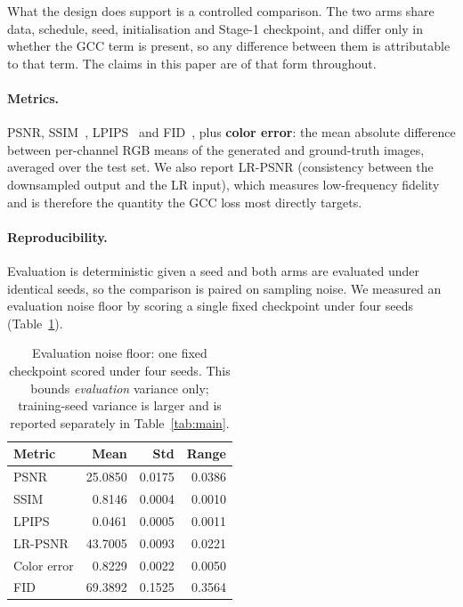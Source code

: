\documentclass[11pt]{article}
\begin{document}
What the design does support is a controlled comparison. The two arms share
data, schedule, seed, initialisation and Stage-1 checkpoint, and differ only in
whether the GCC term is present, so any difference between them is attributable
to that term. The claims in this paper are of that form throughout.

\paragraph{Metrics.} PSNR, SSIM~\cite{wang2004image}, LPIPS~\cite{zhang2018unreasonable} and
FID~\cite{heusel2017gans}, plus \textbf{color error}: the
mean absolute difference between per-channel RGB means of the generated and
ground-truth images, averaged over the test set. We also report LR-PSNR
(consistency between the downsampled output and the LR input), which measures
low-frequency fidelity and is therefore the quantity the GCC loss most directly
targets.

\paragraph{Reproducibility.} Evaluation is deterministic given a seed and both
arms are evaluated under identical seeds, so the comparison is paired on sampling
noise. We measured an evaluation noise floor by scoring a single fixed checkpoint
under four seeds (Table~\ref{tab:noise}).

\begin{table}[t]
\centering
\small
\begin{tabular}{lrrr}
\toprule
Metric & Mean & Std & Range \\
\midrule
PSNR        & 25.0850 & 0.0175 & 0.0386 \\
SSIM        & 0.8146  & 0.0004 & 0.0010 \\
LPIPS       & 0.0461  & 0.0005 & 0.0011 \\
LR-PSNR     & 43.7005 & 0.0093 & 0.0221 \\
Color error & 0.8229  & 0.0022 & 0.0050 \\
FID         & 69.3892 & 0.1525 & 0.3564 \\
\bottomrule
\end{tabular}
\caption{Evaluation noise floor: one fixed checkpoint scored under four seeds.
This bounds \emph{evaluation} variance only; training-seed variance is larger and
is reported separately in Table~\ref{tab:main}.}
\label{tab:noise}
\end{table}
\end{document}
